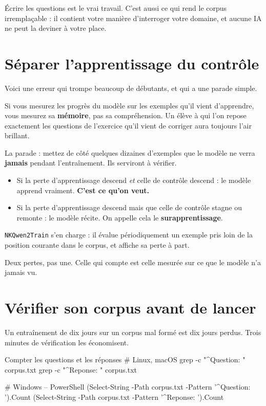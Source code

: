 \begin{nkretenir}
Écrire les questions est le vrai travail. C'est aussi ce qui rend le corpus
irremplaçable : il contient votre manière d'interroger votre domaine, et aucune
IA ne peut la deviner à votre place.
\end{nkretenir}

\section{Séparer l'apprentissage du contrôle}

Voici une erreur qui trompe beaucoup de débutants, et qui a une parade simple.

Si vous mesurez les progrès du modèle sur les exemples qu'il vient
d'apprendre, vous mesurez sa \textbf{mémoire}, pas sa compréhension. Un élève à
qui l'on repose exactement les questions de l'exercice qu'il vient de corriger
aura toujours l'air brillant.

La parade : mettez de côté quelques dizaines d'exemples que le modèle ne verra
\textbf{jamais} pendant l'entraînement. Ils serviront à vérifier.

\begin{itemize}
  \item Si la perte d'apprentissage descend \emph{et} celle de contrôle
        descend : le modèle apprend vraiment. \textbf{C'est ce qu'on veut.}
  \item Si la perte d'apprentissage descend mais que celle de contrôle stagne
        ou remonte : le modèle récite. On appelle cela le
        \textbf{surapprentissage}.
\end{itemize}

\texttt{NKQwen2Train} s'en charge : il évalue périodiquement un exemple pris
loin de la position courante dans le corpus, et affiche sa perte à part.

\begin{nkretenir}
Deux pertes, pas une. Celle qui compte est celle mesurée sur ce que le modèle
n'a jamais vu.
\end{nkretenir}

\section{Vérifier son corpus avant de lancer}

Un entraînement de dix jours sur un corpus mal formé est dix jours perdus.
Trois minutes de vérification les économisent.

\begin{nkcode}[]{Compter les questions et les réponses}
# Linux, macOS
grep -c "^Question: " corpus.txt
grep -c "^Reponse: "  corpus.txt

# Windows -- PowerShell
(Select-String -Path corpus.txt -Pattern '^Question: ').Count
(Select-String -Path corpus.txt -Pattern '^Reponse: ').Count
\end{nkcode}

